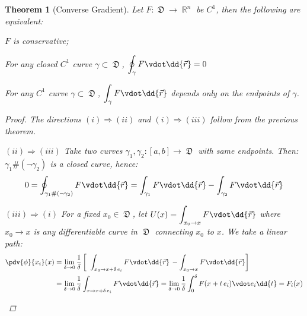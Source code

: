 \documentclass[12pt]{article}
\let\RA\Rightarrow
\DeclareMathOperator{\R}{\mathbb{R}}
\DeclareMathOperator{\D}{\mathfrak{D}}
\newtheorem{theorem}{Theorem}[subsection]
\begin{document}
\begin{theorem}[Converse Gradient]
  Let $F:\D\to\R^n$ be $C^1$, then the following are equivalent:
  \begin{compactenum}[(i)]
    \item $F$ is conservative;
    \item For any closed $C^1$ curve $\gamma\subset\D$, $\displaystyle\oint_\gamma F\vdot\dd{\vec{r}}=0$
    \item For any $C^1$ curve $\gamma\subset\D$, $\displaystyle\int_\gamma F\vdot\dd{\vec{r}}$ depends only on the endpoints of $\gamma$.
  \end{compactenum}
  \begin{proof}
    The directions $(i)\RA(ii)$ and $(i)\RA (iii)$ follow from the previous theorem.
    \begin{compactitem}
      \item[$(ii)\RA(iii)$] Take two curves $\gamma_1,\gamma_2:[a,b]\to\D$ with same endpoints. Then: $\gamma_1\#(\neg\gamma_2)$ is a closed curve, hence: $$0=\oint_{\gamma_1\#(\neg\gamma_2)}F\vdot\dd{\vec{r}}=\int_{\gamma_1}F\vdot\dd{\vec{r}}-\int_{\gamma_2}F\vdot\dd{\vec{r}}$$
      \item[$(iii)\RA(i)$] For a fixed $x_0\in\D$, let $\displaystyle U(x)=\int_{x_0\to x}F\vdot\dd{\vec{r}}$ where $x_0\to x$ is any differentiable curve in $\D$ connecting $x_0$ to $x$. We take a linear path:
      \begin{align*}
        \pdv{\phi}{x_i}(x)&=\lim_{\delta\to 0}\frac{1}{\delta}\left[\;\;\int_{x_0\to x+\delta\,e_i}F\vdot\dd{\vec{r}}\,-\int_{x_0\to x}F\vdot\dd{\vec{r}}\right]\\
        &=\lim_{\delta\to 0}\frac{1}{\delta}\int_{x\to x+\delta\,e_i}F\vdot\dd{\vec{r}}=\lim_{\delta\to 0}\frac{1}{\delta}\int_0^\delta F(x+t\,e_i)\vdot e_i\dd{t}=F_i(x)
      \end{align*} 
    \end{compactitem}
  \end{proof}
\end{theorem}
\end{document}
